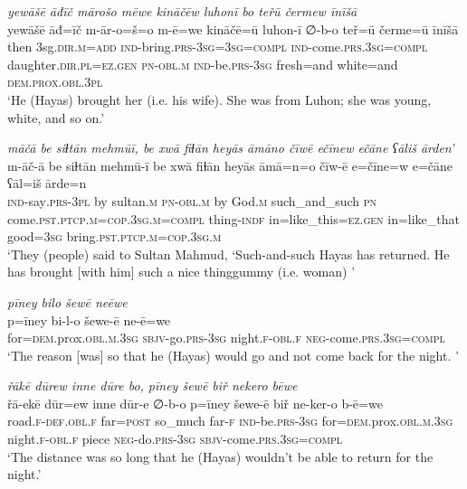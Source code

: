 \ea \label{ŽH.65}
\textit{yewāšē āđīč mārošo mēwe kināčēw luhonī bo teřū čermew īnīšā} \\ 
\gll yewāšē āđ=īč m-ār-o=š=o m-ē=we kināčē=ū luhon-ī ∅-b-o teř=ū čerme=ū īnīšā \\ 
 then 3sg\textsc{.dir}\textsc{.m}\textsc{=add} \textsc{ind-}bring\textsc{.prs}\textsc{-3sg}\textsc{=3sg}\textsc{=compl} \textsc{ind-}come\textsc{.prs}\textsc{.3sg}\textsc{=compl} daughter\textsc{.dir}\textsc{.pl}\textsc{=ez}\textsc{.gen} \textsc{pn}\textsc{-obl}\textsc{.m} \textsc{ind-}be\textsc{.prs}\textsc{-3sg} fresh=and white=and \textsc{dem.prox}\textsc{.obl}\textsc{.3pl} \\ 
\glt `He (Hayas) brought her (i.e. his wife). She was from Luhon; she was young, white, and so on.'
\z 
 
\ea \label{ŽH.66}
\textit{māčā be siɫtān mehmūī, be xwā fiɫān heyās āmāno čīwē ečīnew ečāne ʕāliš ārden’} \\ 
\gll m-āč-ā be siɫtān mehmū-ī be xwā fiɫān heyās āmā=n=o čīw-ē e=čīne=w e=čāne ʕāl=iš ārde=n \\ 
 \textsc{ind-}say\textsc{.prs}\textsc{-3pl} by sultan\textsc{.m} \textsc{pn}\textsc{-obl}\textsc{.m} by God\textsc{.m} such\_and\_such \textsc{pn} come\textsc{.pst}\textsc{.ptcp}\textsc{.m}\textsc{=cop}\textsc{.3sg}\textsc{.m}\textsc{=compl} thing\textsc{-indf} in=like\_this\textsc{=ez}\textsc{.gen} in=like\_that good\textsc{=3sg} bring\textsc{.pst}\textsc{.ptcp}\textsc{.m}\textsc{=cop}\textsc{.3sg}\textsc{.m} \\ 
\glt `They (people) said to Sultan Mahmud, ‘Such-and-such Hayas has returned. He has brought [with him] such a nice thinggummy (i.e. woman)  '
\z 
 
\ea \label{ŽH.70}
\textit{pīney bilo šewē neēwe} \\ 
\gll p=īney bi-l-o šewe-ē ne-ē=we \\ 
 for\textsc{=dem}.prox\textsc{.obl}\textsc{.m}\textsc{.3sg} \textsc{sbjv-}go\textsc{.prs}\textsc{-3sg} night\textsc{\textsc{.f}}\textsc{-obl}\textsc{\textsc{.f}} \textsc{neg-}come\textsc{.prs}\textsc{.3sg}\textsc{=compl} \\ 
\glt `The reason [was] so that he (Hayas) would go and not come back for the night. '
\z 
 
\ea \label{ŽH.71}
\textit{řākē dūrew inne dūre bo, pīney šewē biř nekero bēwe} \\ 
\gll řā-ekē dūr=ew inne dūr-e ∅-b-o p=īney šewe-ē biř ne-ker-o b-ē=we \\ 
 road\textsc{\textsc{.f}}\textsc{-def}\textsc{.obl}\textsc{\textsc{.f}} far\textsc{=\textsc{post}} so\_much far\textsc{-f} \textsc{ind-}be\textsc{.prs}\textsc{-3sg} for\textsc{=dem}.prox\textsc{.obl}\textsc{.m}\textsc{.3sg} night\textsc{\textsc{.f}}\textsc{-obl}\textsc{\textsc{.f}} piece \textsc{neg-}do\textsc{.prs}\textsc{-3sg} \textsc{sbjv-}come\textsc{.prs}\textsc{.3sg}\textsc{=compl} \\ 
\glt `The distance was so long that he (Hayas) wouldn’t be able to return for the night.'
\z 
 
